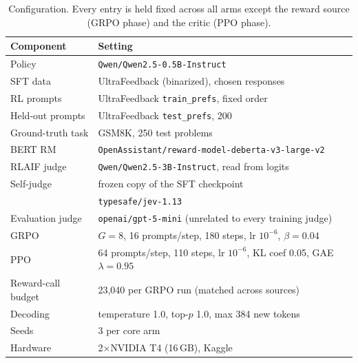 \begin{table}[t]\centering\small
\caption{Configuration. Every entry is held fixed across all arms except the
reward source (GRPO phase) and the critic (PPO phase).}
\label{tab:setup}
\begin{tabular}{ll}
\toprule
Component & Setting \\
\midrule
Policy & \texttt{Qwen/Qwen2.5-0.5B-Instruct} \\
SFT data & UltraFeedback (binarized), chosen responses \\
RL prompts & UltraFeedback \texttt{train\_prefs}, fixed order \\
Held-out prompts & UltraFeedback \texttt{test\_prefs}, 200 \\
Ground-truth task & GSM8K, 250 test problems \\
BERT RM & \texttt{OpenAssistant/reward-model-deberta-v3-large-v2} \\
RLAIF judge & \texttt{Qwen/Qwen2.5-3B-Instruct}, read from logits \\
Self-judge & frozen copy of the SFT checkpoint \\
\jev{} & \texttt{typesafe/jev-1.13} \\
Evaluation judge & \texttt{openai/gpt-5-mini} (unrelated to every training judge) \\
GRPO & $G=8$, 16 prompts/step, 180 steps, lr $10^{-6}$, $\beta=0.04$ \\
PPO & 64 prompts/step, 110 steps, lr $10^{-6}$, KL coef 0.05, GAE $\lambda=0.95$ \\
Reward-call budget & 23,040 per GRPO run (matched across sources) \\
Decoding & temperature 1.0, top-$p$ 1.0, max 384 new tokens \\
Seeds & 3 per core arm \\
Hardware & 2$\times$NVIDIA T4 (16\,GB), Kaggle \\
\bottomrule
\end{tabular}
\end{table}
